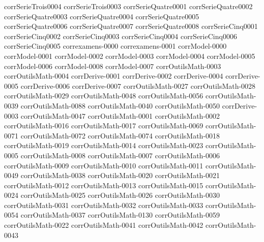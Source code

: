{corrSerieTrois0004}
{corrSerieTrois0003}
{corrSerieQuatre0001}
{corrSerieQuatre0002}
{corrSerieQuatre0003}
{corrSerieQuatre0004}
{corrSerieQuatre0005}
{corrSerieQuatre0006}
{corrSerieQuatre0007}
{corrSerieQuatre0008}
{corrSerieCinq0001}
{corrSerieCinq0002}
{corrSerieCinq0003}
{corrSerieCinq0004}
{corrSerieCinq0006}
{corrSerieCinq0005}
{correxamens-0000}
{correxamens-0001}
{corrModel-0000}
{corrModel-0001}
{corrModel-0002}
{corrModel-0003}
{corrModel-0004}
{corrModel-0005}
{corrModel-0006}
{corrModel-0008}
{corrModel-0007}
{corrOutilsMath-0003}
{corrOutilsMath-0004}
{corrDerive-0001}
{corrDerive-0002}
{corrDerive-0004}
{corrDerive-0005}
{corrDerive-0006}
{corrDerive-0007}
{corrOutilsMath-0027}
{corrOutilsMath-0028}
{corrOutilsMath-0029}
{corrOutilsMath-0048}
{corrOutilsMath-0056}
{corrOutilsMath-0039}
{corrOutilsMath-0088}
{corrOutilsMath-0040}
{corrOutilsMath-0050}
{corrDerive-0003}
{corrOutilsMath-0047}
{corrOutilsMath-0001}
{corrOutilsMath-0002}
{corrOutilsMath-0016}
{corrOutilsMath-0017}
{corrOutilsMath-0069}
{corrOutilsMath-0071}
{corrOutilsMath-0072}
{corrOutilsMath-0074}
{corrOutilsMath-0018}
{corrOutilsMath-0019}
{corrOutilsMath-0014}
{corrOutilsMath-0023}
{corrOutilsMath-0005}
{corrOutilsMath-0008}
{corrOutilsMath-0007}
{corrOutilsMath-0006}
{corrOutilsMath-0009}
{corrOutilsMath-0010}
{corrOutilsMath-0011}
{corrOutilsMath-0049}
{corrOutilsMath-0038}
{corrOutilsMath-0020}
{corrOutilsMath-0021}
{corrOutilsMath-0012}
{corrOutilsMath-0013}
{corrOutilsMath-0015}
{corrOutilsMath-0024}
{corrOutilsMath-0025}
{corrOutilsMath-0026}
{corrOutilsMath-0030}
{corrOutilsMath-0031}
{corrOutilsMath-0032}
{corrOutilsMath-0033}
{corrOutilsMath-0054}
{corrOutilsMath-0037}
{corrOutilsMath-0130}
{corrOutilsMath-0059}
{corrOutilsMath-0022}
{corrOutilsMath-0041}
{corrOutilsMath-0042}
{corrOutilsMath-0043}
